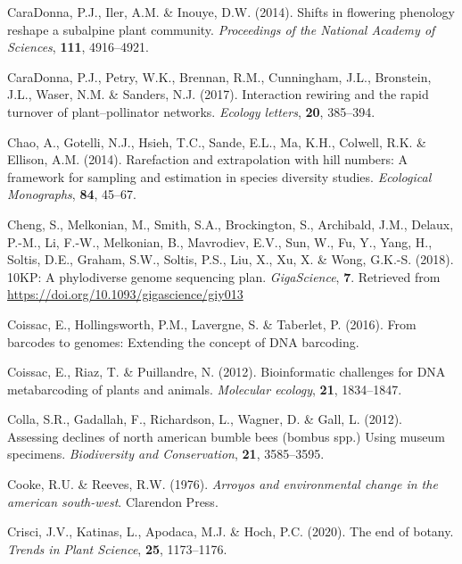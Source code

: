 \documentclass[
]{article}
\newlength{\cslhangindent}
\newlength{\cslentryspacingunit} %
\newenvironment{CSLReferences}[2] %
 {%
  \setlength{\parindent}{0pt}
  \ifodd #1
  \let\oldpar\par
  \def\par{\hangindent=\cslhangindent\oldpar}
  \fi
  \setlength{\parskip}{#2\cslentryspacingunit}
 }%
 {}
\begin{document}
\begin{CSLReferences}{1}{0}
\leavevmode{}%
CaraDonna, P.J., Iler, A.M. \& Inouye, D.W. (2014). Shifts in flowering
phenology reshape a subalpine plant community. \emph{Proceedings of the
National Academy of Sciences}, \textbf{111}, 4916--4921.

\leavevmode{}%
CaraDonna, P.J., Petry, W.K., Brennan, R.M., Cunningham, J.L.,
Bronstein, J.L., Waser, N.M. \& Sanders, N.J. (2017). Interaction
rewiring and the rapid turnover of plant--pollinator networks.
\emph{Ecology letters}, \textbf{20}, 385--394.

\leavevmode{}%
Chao, A., Gotelli, N.J., Hsieh, T.C., Sande, E.L., Ma, K.H., Colwell,
R.K. \& Ellison, A.M. (2014). Rarefaction and extrapolation with hill
numbers: A framework for sampling and estimation in species diversity
studies. \emph{Ecological Monographs}, \textbf{84}, 45--67.

\leavevmode{}%
Cheng, S., Melkonian, M., Smith, S.A., Brockington, S., Archibald, J.M.,
Delaux, P.-M., Li, F.-W., Melkonian, B., Mavrodiev, E.V., Sun, W., Fu,
Y., Yang, H., Soltis, D.E., Graham, S.W., Soltis, P.S., Liu, X., Xu, X.
\& Wong, G.K.-S. (2018). {10KP: A phylodiverse genome sequencing plan}.
\emph{GigaScience}, \textbf{7}. Retrieved from
\url{https://doi.org/10.1093/gigascience/giy013}

\leavevmode{}%
Coissac, E., Hollingsworth, P.M., Lavergne, S. \& Taberlet, P. (2016).
From barcodes to genomes: Extending the concept of DNA barcoding.

\leavevmode{}%
Coissac, E., Riaz, T. \& Puillandre, N. (2012). Bioinformatic challenges
for DNA metabarcoding of plants and animals. \emph{Molecular ecology},
\textbf{21}, 1834--1847.

\leavevmode{}%
Colla, S.R., Gadallah, F., Richardson, L., Wagner, D. \& Gall, L.
(2012). Assessing declines of north american bumble bees (bombus spp.)
Using museum specimens. \emph{Biodiversity and Conservation},
\textbf{21}, 3585--3595.

\leavevmode{}%
Cooke, R.U. \& Reeves, R.W. (1976). \emph{Arroyos and environmental
change in the american south-west}. Clarendon Press.

\leavevmode{}%
Crisci, J.V., Katinas, L., Apodaca, M.J. \& Hoch, P.C. (2020). The end
of botany. \emph{Trends in Plant Science}, \textbf{25}, 1173--1176.


\end{CSLReferences}
\end{document}
